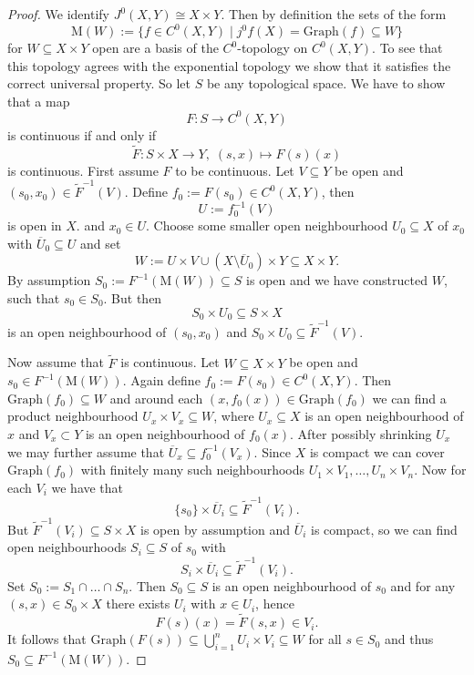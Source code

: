 \begin{proof}
    We identify $J^0(X,Y) \cong X \times Y$. Then by definition the sets of the form 
    \[
    \mathrm{M}(W) := \{f \in C^0(X,Y) \mid j^0f(X) = \mathrm{Graph}(f) \subseteq W\}
    \]
    for $W\subseteq X \times Y$ open are a basis of the $C^0$-topology on $C^0(X,Y)$. To see that this topology agrees with the exponential topology we show that it satisfies the correct universal property. So let $S$ be any topological space. We have to show that a map 
    \[
    F \colon S \to C^0(X,Y)
    \]
    is continuous if and only if 
    \[
    \widetilde{F} \colon S \times X \to Y, \; (s,x) \mapsto F(s)(x)
    \]
    is continuous. First assume $F$ to be continuous. Let $V\subseteq Y$ be open and $(s_0,x_0) \in \widetilde{F}^{-1}(V)$. Define $f_0 := F(s_0) \in C^0(X,Y)$, then 
    \[
    U := f_0^{-1}(V)
    \]
    is open in $X$. and $x_0 \in U$. Choose some smaller open neighbourhood $U_0 \subseteq X$ of $x_0$ with $\overline{U}_0 \subseteq U$ and set 
    \[
    W := U \times V \cup (X\setminus \overline{U}_0) \times Y \subseteq X \times Y.
    \]
    By assumption $S_0 := F^{-1}(\mathrm{M}(W)) \subseteq S$ is open and we have constructed $W$, such that $s_0 \in S_0$. But then 
    \[
    S_0 \times U_0 \subseteq S \times X
    \]
    is an open neighbourhood of $(s_0,x_0)$ and $S_0 \times U_0 \subseteq \widetilde{F}^{-1}(V)$.

    Now assume that $\widetilde{F}$ is continuous. Let $W\subseteq X \times Y$ be open and $s_0 \in F^{-1}(\mathrm{M}(W))$. Again define $f_0 := F(s_0) \in C^0(X,Y)$. Then $\mathrm{Graph}(f_0) \subseteq W$ and around each $(x,f_0(x)) \in \mathrm{Graph}(f_0)$ we can find a product neighbourhood $U_x \times V_x \subseteq W$, where $U_x \subseteq X$ is an open neighbourhood of $x$ and $V_x \subset Y$ is an open neighbourhood of $f_0(x)$. After possibly shrinking $U_x$ we may further assume that $\overline{U}_x \subseteq f_0^{-1}(V_x)$. Since $X$ is compact we can cover $\mathrm{Graph}(f_0)$ with finitely many such neighbourhoods $U_1 \times V_1,\ldots,U_n\times V_n$. Now for each $V_i$ we have that 
    \[
    \{s_0\} \times \overline{U}_i \subseteq \widetilde{F}^{-1}(V_i).
    \]
    But $\widetilde{F}^{-1}(V_i) \subseteq S \times X$ is open by assumption and $\overline{U}_i$ is compact, so we can find open neighbourhoods $S_i \subseteq S$ of $s_0$ with 
    \[
    S_i \times \overline{U}_i \subseteq \widetilde{F}^{-1}(V_i).
    \]
    Set $S_0 := S_1 \cap \ldots \cap S_n$. Then $S_0 \subseteq S$ is an open neighbourhood of $s_0$ and for any $(s,x) \in S_0 \times X$ there exists $U_i$ with $x \in U_i$, hence 
    \[
    F(s)(x) = \widetilde{F}(s,x) \in V_i.
    \]
    It follows that $\mathrm{Graph}(F(s)) \subseteq \bigcup_{i=1}^n U_i \times V_i \subseteq W$ for all $s \in S_0$ and thus $S_0 \subseteq F^{-1}(\mathrm{M}(W))$.
\end{proof}

